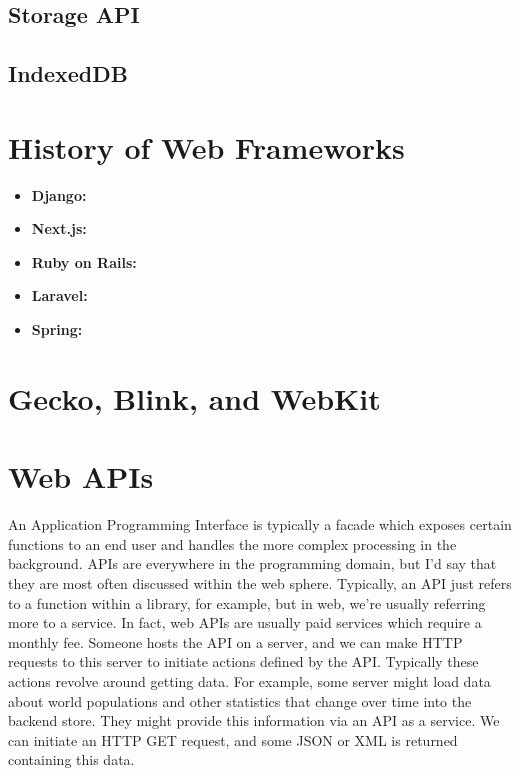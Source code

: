 \documentclass{article}
\begin{document}
\subsection{Storage API}

\subsection{IndexedDB}

\section{History of Web Frameworks}

\begin{itemize}

\item{%
    \textbf{Django:}
}

\item{%
    \textbf{Next.js:}
}

\item{%
    \textbf{Ruby on Rails:}
}

\item{%
    \textbf{Laravel:}
}

\item{%
    \textbf{Spring:}
}

\end{itemize}

\section{Gecko, Blink, and WebKit}

\section{Web APIs}

An Application Programming Interface is typically a facade which exposes certain functions to an end user and
handles the more complex processing in the background. APIs are everywhere in the programming domain, but I'd
say that they are most often discussed within the web sphere. Typically, an API just refers to a function
within a library, for example, but in web, we're usually referring more to a service. In fact, web APIs are
usually paid services which require a monthly fee. Someone hosts the API on a server, and we can make HTTP
requests to this server to initiate actions defined by the API. Typically these actions revolve around getting
data. For example, some server might load data about world populations and other statistics that change over
time into the backend store. They might provide this information via an API as a service. We can initiate an
HTTP GET request, and some JSON or XML is returned containing this data.
\end{document}
